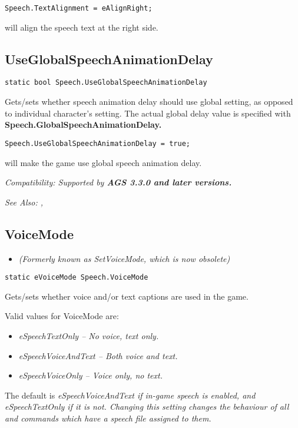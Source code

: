 \begin{verbatim}
Speech.TextAlignment = eAlignRight;
\end{verbatim}
will align the speech text at the right side.


\subsection{UseGlobalSpeechAnimationDelay}\label{Speech.UseGlobalSpeechAnimationDelay}%

\begin{verbatim}
static bool Speech.UseGlobalSpeechAnimationDelay
\end{verbatim}

Gets/sets whether speech animation delay should use global setting, as opposed to individual character's setting.
The actual global delay value is specified with \bf{Speech.GlobalSpeechAnimationDelay}.

\begin{verbatim}
Speech.UseGlobalSpeechAnimationDelay = true;
\end{verbatim}
will make the game use global speech animation delay.

\it{Compatibility:} Supported by \bf{AGS 3.3.0} and later versions.

\it{See Also:} ,


\subsection{VoiceMode}\label{Speech.VoiceMode}%

\begin{itemize}
\item \it{(Formerly known as SetVoiceMode, which is now obsolete)}
\end{itemize}

\begin{verbatim}
static eVoiceMode Speech.VoiceMode
\end{verbatim}

Gets/sets whether voice and/or text captions are used in the game.

Valid values for VoiceMode are:
\begin{itemize}
\item \it{eSpeechTextOnly} -- No voice, text only.
\item \it{eSpeechVoiceAndText} -- Both voice and text.
\item \it{eSpeechVoiceOnly} -- Voice only, no text.
\end{itemize}
The default is \it{eSpeechVoiceAndText} if in-game speech is enabled, and \it{eSpeechTextOnly} if it
is not. Changing this setting changes the behaviour of all  and
 commands which have a speech file assigned to them.

